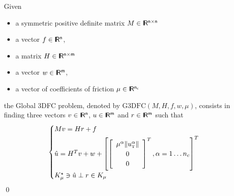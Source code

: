\documentclass[twoside]{article}
\def\t{{\hbox{\tiny{T}}}}
\newcommand{\RR}{\ensuremath{\rm\sf I\!R}}
\begin{document}
\begin{definition}
  Given
  \begin{itemize}
    \item a symmetric positive definite matrix ${M} \in \RR^{n \times n}$
    \item a vector $ {f} \in \RR^n$,
    \item a matrix  ${H} \in \RR^{n \times m}$
    \item a vector $w \in \RR^{m}$,
    \item a vector of coefficients of friction $\mu \in \RR^{n_c}$
  \end{itemize}
 the Global 3DFC problem, denoted by $\mathrm{G3DFC}(M,H,f,w,\mu)$, consists in finding three vectors $ {v} \in \RR^n$, $u\in\RR^m$ and $r\in \RR^m$  such that
\begin{equation}\label{eq:Gfc3d}
  \begin{cases}
    M v = {H} {r} + {f} \\[1mm]
    \hat u = H^T v + w +\left[
      \left[\begin{array}{c}
        \mu^\alpha \|u^\alpha_\t\|\\
        0 \\
        0
      \end{array}\right]^T, \alpha = 1 \ldots n_c
\right]^T \\[1mm]
    K^\star_{\mu} \ni {\hat u} \perp r \in K_{\mu}
  \end{cases}
\end{equation}
\qed
\end{definition}
\end{document}
